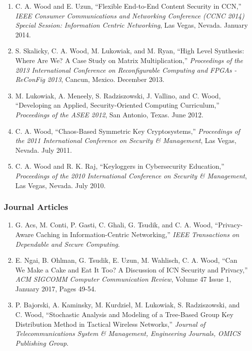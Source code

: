 \documentclass[10pt]{res} %
\begin{document}
\begin{resume}
\begin{enumerate}[C-1.]
\item C. A. Wood and E. Uzun, ``Flexible End-to-End Content Security in CCN,'' \emph{IEEE Consumer Communications and Networking Conference (CCNC 2014) Special Session: Information Centric Networking}, Las Vegas, Nevada. January 2014.

\item S. Skalicky, C. A. Wood, M. Lukowiak, and M. Ryan, ``High Level Synthesis: Where Are We? A Case Study on Matrix Multiplication,'' \emph{Proceedings of the 2013 International Conference on Reconfigurable Computing and FPGAs - ReConFig 2013}, Cancun, Mexico. December 2013.

\item M. Lukowiak, A. Meneely, S. Radziszowski, J. Vallino, and C. Wood, ``Developing an Applied, Security-Oriented Computing Curriculum,'' \emph{Proceedings of the ASEE 2012}, San Antonio, Texas. June 2012.

\item C. A. Wood, ``Chaos-Based Symmetric Key Cryptosystems,'' \emph{Proceedings of the 2011 International Conference on Security \& Management}, Las Vegas, Nevada. July 2011.

\item C. A. Wood and R. K. Raj, ``Keyloggers in Cybersecurity Education,'' \emph{Proceedings of the 2010 International Conference on Security \& Management}, Las Vegas, Nevada. July 2010.

\end{enumerate}

\vspace{-15pt}
\subsubsection*{Journal Articles}

\begin{enumerate}[J-1.]

\item G. Acs, M. Conti, P. Gasti, C. Ghali, G. Tsudik, and C. A. Wood, ``Privacy-Aware Caching in Information-Centric Networking,'' \emph{IEEE Transactions on Dependable and Secure Computing}.

\item E. Ngai, B. Ohlman, G. Tsudik, E. Uzun, M. Wahlisch, C. A. Wood, ``Can We Make a Cake and Eat It Too? A Discussion of ICN Security and Privacy,'' \emph{ACM SIGCOMM Computer Communication Review}, Volume 47 Issue 1, January 2017, Pages 49-54.

\item P. Bajorski, A. Kaminsky, M. Kurdziel, M. Lukowiak, S. Radziszowski, and C. Wood, ``Stochastic Analysis and Modeling of a Tree-Based Group Key Distribution Method in Tactical Wireless Networks,'' \emph{Journal of Telecommunications System \& Management, Engineering Journals, OMICS Publishing Group}.


\end{enumerate}
\end{resume}
\end{document}
